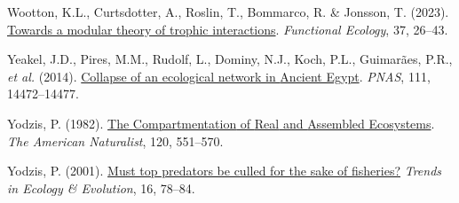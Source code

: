 \documentclass[
]{article}
\newlength{\cslhangindent}
\newenvironment{CSLReferences}[2] %
 {\begin{list}{}{%
  \setlength{\itemindent}{0pt}
  \setlength{\leftmargin}{0pt}
  \setlength{\parsep}{0pt}
  \ifodd #1
   \setlength{\leftmargin}{\cslhangindent}
   \setlength{\itemindent}{-1\cslhangindent}
  \fi
  \setlength{\itemsep}{#2\baselineskip}}}
 {\end{list}}
\begin{document}
\begin{CSLReferences}{1}{0}
Wootton, K.L., Curtsdotter, A., Roslin, T., Bommarco, R. \& Jonsson, T.
(2023). \href{https://doi.org/10.1111/1365-2435.13954}{Towards a modular
theory of trophic interactions}. \emph{Functional Ecology}, 37, 26--43.

Yeakel, J.D., Pires, M.M., Rudolf, L., Dominy, N.J., Koch, P.L.,
Guimarães, P.R., \emph{et al.} (2014).
\href{https://doi.org/10.1073/pnas.1408471111}{Collapse of an ecological
network in {Ancient Egypt}}. \emph{PNAS}, 111, 14472--14477.

Yodzis, P. (1982). \href{https://doi.org/10.1086/284013}{The
{Compartmentation} of {Real} and {Assembled Ecosystems}}. \emph{The
American Naturalist}, 120, 551--570.

Yodzis, P. (2001).
\href{https://doi.org/10.1016/S0169-5347(00)02062-0}{Must top predators
be culled for the sake of fisheries?} \emph{Trends in Ecology \&
Evolution}, 16, 78--84.

\end{CSLReferences}
\end{document}

